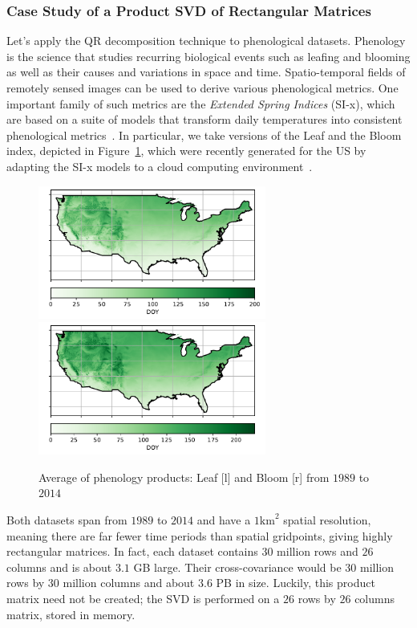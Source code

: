 \documentclass[ijgi,article,submit,moreauthors,pdftex,10pt,a4paper]{Definitions/mdpi}
\begin{document}
\subsubsection{Case Study of a Product SVD of Rectangular Matrices}
\label{sec:Results/Case Study of a Product SVD of Rectangular Matrices}

Let's apply the QR decomposition technique to phenological datasets. Phenology is the science that studies recurring biological events such as leafing and blooming as well as their causes and variations in space and time. Spatio-temporal fields of remotely sensed images can be used to derive various phenological metrics. One important family of such metrics are the \textit{Extended Spring Indices} (SI-x), which are based on a suite of models that transform daily temperatures into consistent phenological metrics~\cite{Schwartz2013}. In particular, we take versions of the Leaf and the Bloom index, depicted in Figure~\ref{fig:phenologydata}, which were recently generated for the US by adapting the SI-x models to a cloud computing environment~\cite{Izquierdo2015}. 

\begin{figure}[H]
\centering
\includegraphics[width=7.5cm]{Results/Leafmean.pdf} ~~~~~ \includegraphics[width=7.5cm]{Results/Bloommean.pdf}
\caption{Average of phenology products: Leaf [l] and Bloom [r] from $1989$ to $2014$}
\label{fig:phenologydata}
\end{figure}

Both datasets span from $1989$ to $2014$ and have a $1\text{km}^2$ spatial resolution, meaning there are far fewer time periods than spatial gridpoints, giving highly rectangular matrices. In fact, each dataset contains $30$ million rows and $26$ columns and is about $3.1$ GB large. Their cross-covariance would be $30$ million rows by $30$ million columns and about $3.6$ PB in size. Luckily, this product matrix need not be created; the SVD is performed on a $26$ rows by $26$ columns matrix, stored in memory.
\end{document}
